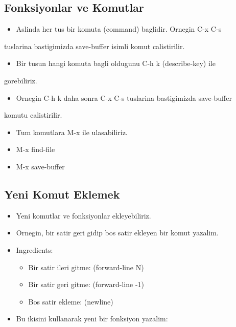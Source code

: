 \documentclass[11pt]{article}
\begin{document}
\subsection{Fonksiyonlar ve Komutlar}
\label{sec-3-3}

\begin{itemize}
\item Aslinda her tus bir komuta (command) baglidir. Ornegin C-x C-s
\end{itemize}
tuslarina bastigimizda save-buffer isimli komut calistirilir.

\begin{itemize}
\item Bir tusun hangi komuta bagli oldugunu C-h k (describe-key) ile
\end{itemize}
gorebiliriz.

\begin{itemize}
\item Ornegin C-h k daha sonra C-x C-s tuslarina bastigimizda save-buffer
\end{itemize}
komutu calistirilir.

\begin{itemize}
\item Tum komutlara M-x ile ulasabiliriz.

\item M-x find-file

\item M-x save-buffer
\end{itemize}

\subsection{Yeni Komut Eklemek}
\label{sec-3-4}

\begin{itemize}
\item Yeni komutlar ve fonksiyonlar ekleyebiliriz.

\item Ornegin, bir satir geri gidip bos satir ekleyen bir komut yazalim.

\item Ingredients:
\begin{itemize}
\item Bir satir ileri gitme: (forward-line N)
\item Bir satir geri gitme: (forward-line -1)
\item Bos satir ekleme: (newline)
\end{itemize}

\item Bu ikisini kullanarak yeni bir fonksiyon yazalim:
\end{itemize}
\end{document}
